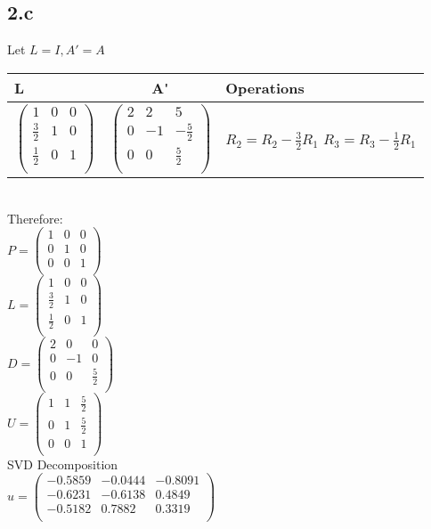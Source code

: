 \documentclass{article}
\begin{document}
\subsection*{2.c}
Let $ L = I, A' = A$ \\
\begin{tabular}{|l|c|p{5cm}|}
\hline
\textbf{L} & \textbf{A\'} & \textbf{Operations}\\
\hline
$\begin{pmatrix}
    1 & 0 & 0 \\
    \frac{3}{2} & 1 & 0 \\
    \frac{1}{2} & 0 & 1 \\
\end{pmatrix}$
&
$\begin{pmatrix}
    2 & 2 & 5 \\
    0 & -1 & -\frac{5}{2} \\
    0 & 0 & \frac{5}{2} \\
\end{pmatrix}$
&
$R_2 = R_2 - \frac{3}{2} R_1 $ \newline
$R_3 = R_3 - \frac{1}{2} R_1$ \\
\hline
\end{tabular} \\
Therefore: \\
$P =
\begin{pmatrix}
    1 & 0 & 0 \\
    0 & 1 & 0 \\
    0 & 0 & 1 \\
\end{pmatrix}
$ \\
$L = 
\begin{pmatrix}
    1 & 0 & 0 \\
    \frac{3}{2} & 1 & 0 \\
    \frac{1}{2} & 0 & 1 \\
\end{pmatrix}$\\
$D = 
\begin{pmatrix}
    2 & 0 & 0 \\
    0 & -1 & 0 \\
    0 & 0 & \frac{5}{2} \\
\end{pmatrix}
$ \\
$
U = 
\begin{pmatrix}
    1 & 1 & \frac{5}{2} \\
    0 & 1 & \frac{5}{2} \\
    0 & 0 & 1 \\
\end{pmatrix}
$ \\
SVD Decomposition\\
$
u =
\begin{pmatrix}
   -0.5859  & -0.0444 &  -0.8091 \\
   -0.6231  & -0.6138 &   0.4849 \\
   -0.5182  &  0.7882 &   0.3319 \\
\end{pmatrix}$\\
\end{document}
